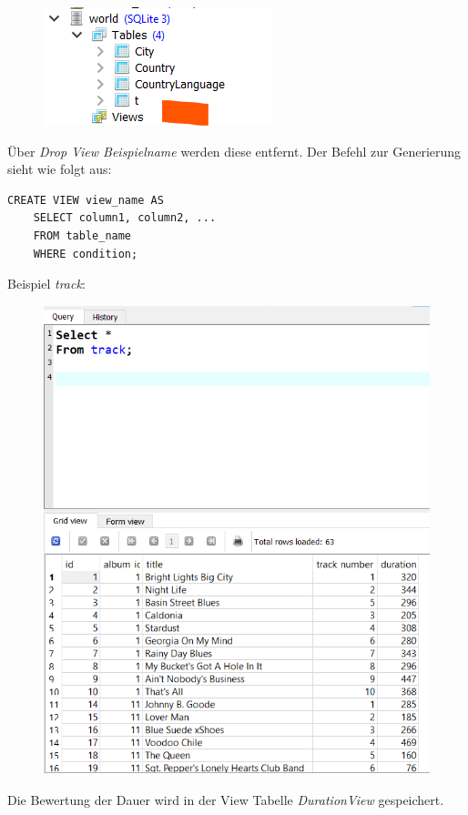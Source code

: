 	\begin{figure}[H]
	\centering
	\includegraphics[scale = 0.3]{attachment/chapter_3/Scc066}
	\caption{}
	\label{fig:Scc066}
\end{figure}
Über \textit{Drop View Beispielname} werden diese entfernt. Der Befehl zur Generierung sieht wie folgt aus: 
\begin{lstlisting}[style=SQL]
	CREATE VIEW view_name AS
	SELECT column1, column2, ...
	FROM table_name
	WHERE condition;
\end{lstlisting}

Beispiel \textit{track}:
\begin{figure}[H]
	\centering
	\includegraphics[scale = 0.3]{attachment/chapter_3/Scc067}
	\caption{}
	\label{fig:Scc067}
\end{figure}

Die Bewertung der Dauer wird in der View Tabelle \textit{DurationView} gespeichert.
